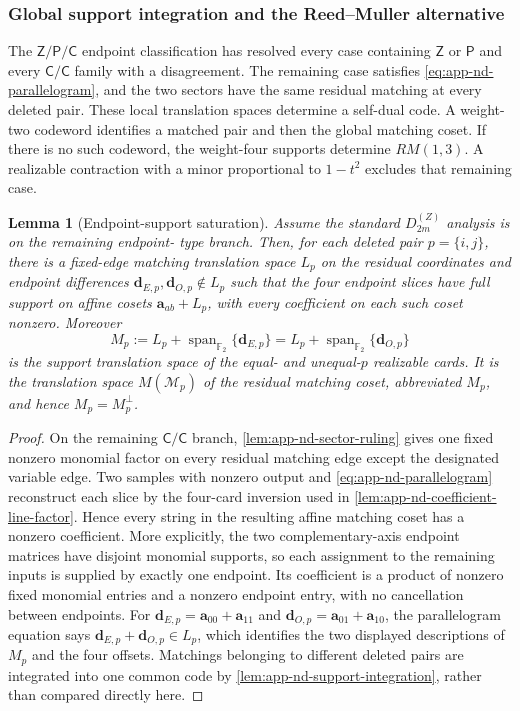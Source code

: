 \documentclass[11pt,letterpaper,onecolumn]{article}
\theoremstyle{plain}
\newtheorem{lemma}[lemma]{Lemma}
\theoremstyle{definition}
\theoremstyle{remark}
\newcommand{\Ftwo}{\mathbb F_2}
\newcommand{\DihZ}[1]{{D_{#1}^{(Z)}}}
\newcommand{\Span}{\operatorname{span}}
\begin{document}
\subsubsection{Global support integration and the Reed--Muller alternative}
\label{proofsubsec:nd-global-support}

The \(\mathsf Z/\mathsf P/\mathsf C\) endpoint classification has resolved every case
containing \(\mathsf Z\) or \(\mathsf P\) and every
\(\mathsf{C}/\mathsf{C}\) family with a disagreement. The remaining case satisfies
\cref{eq:app-nd-parallelogram}, and the two sectors have the same residual
matching at every deleted pair.  These local translation spaces determine a self-dual code. A weight-two
codeword identifies a matched pair and then the global matching coset.
If there is no such codeword, the weight-four supports determine
\(RM(1,3)\). A realizable contraction with a minor proportional to
\(1-t^2\) excludes that remaining case.

\begin{lemma}[Endpoint-support saturation]
\label{lem:app-nd-endpoint-support-saturation}
Assume the standard \(\DihZ{2m}\) analysis is on the remaining endpoint-
type branch.  Then, for each deleted pair
\(p=\{i,j\}\), there is a fixed-edge matching translation space \(L_p\) on the
residual coordinates and endpoint differences \({\mathbf{d}}_{E,p},{\mathbf{d}}_{O,p}\notin L_p\)
such that the four endpoint slices have full support on affine cosets
\({\mathbf{a}}_{ab}+L_p\), with every coefficient on each such coset nonzero.  Moreover
\[
 M_p:=L_p+\Span_{\Ftwo}\{{\mathbf{d}}_{E,p}\}
     =L_p+\Span_{\Ftwo}\{{\mathbf{d}}_{O,p}\}
\]
is the support translation space of the equal- and unequal-\(p\) realizable cards. It is the
translation space \(M(\mathcal M_p)\) of the residual matching coset,
abbreviated \(M_p\), and hence \(M_p=M_p^\perp\).
\end{lemma}

\begin{proof}
On the remaining \(\mathsf{C}/\mathsf{C}\) branch,
\cref{lem:app-nd-sector-ruling} gives one fixed
nonzero monomial factor on every residual matching edge except the designated
variable edge.  Two samples with nonzero output and \cref{eq:app-nd-parallelogram} reconstruct
each slice by the four-card inversion used in
\cref{lem:app-nd-coefficient-line-factor}. Hence every string in the resulting
affine matching coset has a nonzero coefficient.  More explicitly, the two
complementary-axis endpoint matrices have disjoint monomial supports, so each
assignment to the remaining inputs is supplied by exactly one endpoint. Its coefficient is a
product of nonzero fixed monomial entries and a nonzero endpoint entry, with
no cancellation between endpoints. For
\({\mathbf{d}}_{E,p}={\mathbf{a}}_{00}+{\mathbf{a}}_{11}\) and
\({\mathbf{d}}_{O,p}={\mathbf{a}}_{01}+{\mathbf{a}}_{10}\), the parallelogram equation says
\({\mathbf{d}}_{E,p}+{\mathbf{d}}_{O,p}\in L_p\), which identifies the two displayed descriptions
of \(M_p\) and the four offsets.  Matchings belonging to different deleted
pairs are integrated into one common code by
\cref{lem:app-nd-support-integration}, rather than compared directly here.
\end{proof}
\end{document}
